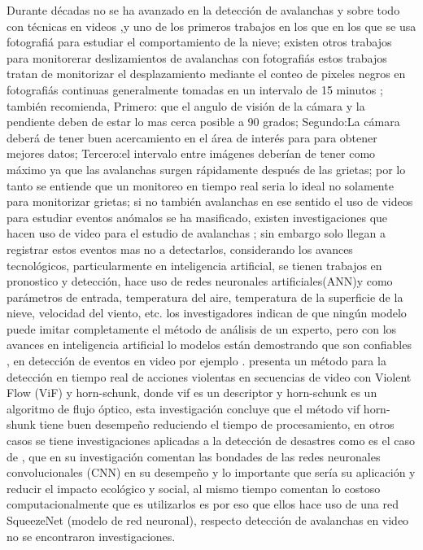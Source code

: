 \documentclass[a4paper,11pt]{report}
\begin{document}
Durante décadas no se ha avanzado en la detección de avalanchas y sobre todo con técnicas en videos \cite{Christiansen2001},y  uno de los primeros trabajos en los que en los que se usa fotografiá para estudiar el comportamiento de la nieve\cite{Christiansen2001}; existen otros trabajos para monitorerar  deslizamientos de avalanchas con fotografiás estos trabajos tratan de monitorizar el desplazamiento mediante el conteo de pixeles negros en fotografiás continuas generalmente tomadas en un intervalo de 15 minutos \cite{Thesis2014,Herwijnen2012,Herwijnen2013}; también \cite{Herwijnen2012} recomienda, Primero: que el angulo de visión de la cámara y la pendiente deben de estar lo mas cerca posible a  90 grados; Segundo:La cámara deberá de tener buen acercamiento en el área de interés para para obtener mejores datos; Tercero:el intervalo entre imágenes deberían de tener como máximo ya que las avalanchas surgen rápidamente después de las grietas; por lo tanto  se entiende que un monitoreo en tiempo real seria lo ideal no solamente para monitorizar grietas; si no también avalanchas en ese sentido el uso de videos para estudiar eventos anómalos se ha masificado, existen investigaciones que hacen uso de video para el estudio de avalanchas \cite{Akitaya1980,Nishimura1993}; sin embargo solo llegan a registrar estos eventos mas no a detectarlos, considerando los avances tecnológicos, particularmente en inteligencia artificial, se tienen trabajos en pronostico y detección,\cite{Singh2008} hace  uso de redes neuronales artificiales(ANN)y como parámetros de entrada, temperatura del aire, temperatura de la superficie de la nieve, velocidad del viento, etc. los investigadores indican de que ningún modelo puede imitar completamente el método de análisis de un experto, pero con los avances en inteligencia artificial lo modelos están demostrando que son confiables , en  detección de eventos en video por ejemplo \cite{Arceda2015}. presenta un método  para la detección en tiempo real de acciones violentas en secuencias de video con Violent Flow (ViF) y horn-schunk, donde vif es un descriptor y horn-schunk  es un algoritmo de flujo óptico, esta investigación concluye que el método vif horn-shunk tiene buen desempeño reduciendo el tiempo de procesamiento, en otros casos se tiene investigaciones aplicadas a la detección de desastres como es el caso de \cite{Muhammad2019}, que en su investigación comentan las bondades de las redes neuronales convolucionales (CNN) en su desempeño  y lo importante que sería su aplicación y reducir el impacto ecológico y social, al mismo tiempo comentan lo costoso computacionalmente que es utilizarlos es por eso que ellos hace uso de una red SqueezeNet (modelo de red neuronal), respecto  detección de avalanchas en video no se encontraron  investigaciones.
\end{document}
